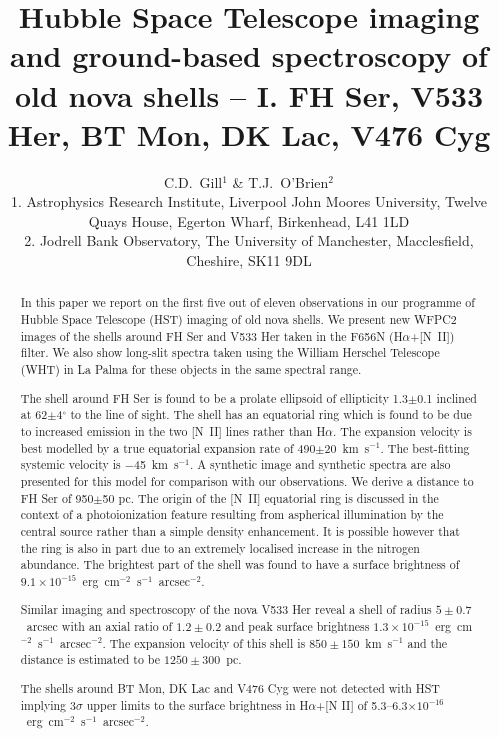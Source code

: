 
\title
[HST imaging and ground-based spectroscopy of nova shells -- I] 
{Hubble Space Telescope
imaging and ground-based spectroscopy of old nova shells -- I. 
FH Ser, V533 Her, BT Mon, DK Lac, V476 Cyg}
\author[C.D.\ Gill \& T.J.\ O'Brien]
{C.D.\ Gill$^1$ \& T.J.\ O'Brien$^2$ 
\\
1. Astrophysics Research Institute, Liverpool John Moores University, 
Twelve Quays House, Egerton Wharf, Birkenhead, L41 1LD\\
2. Jodrell Bank Observatory, The University of Manchester, Macclesfield, Cheshire, SK11 9DL
}
\maketitle
\begin{abstract}
In this paper we report on the first five out of eleven observations in
our programme of Hubble Space Telescope (HST) imaging of old nova shells.
We present new WFPC2 images of the shells around FH Ser and V533 Her 
taken in the F656N
(H$\alpha$+[N~II]) filter. We also show long-slit spectra taken using
the William Herschel Telescope (WHT) in La Palma for these objects in 
the same spectral range.

The shell around FH Ser is found to be a prolate ellipsoid of
ellipticity 1.3$\pm$0.1 inclined at 62$\pm$4$^\circ$ to the line of
sight.  The shell has an equatorial ring which is found to be due to
increased emission in the two [N~II] lines rather than H$\alpha$. The
expansion velocity is best modelled by a true equatorial expansion
rate of 490$\pm$20~km~s$^{-1}$. The best-fitting systemic velocity is
$-$45~km~s$^{-1}$.  A synthetic image and synthetic spectra are also
presented for this model for comparison with our observations. We
derive a distance to FH Ser of 950$\pm$50 pc. The origin of the [N~II]
equatorial ring is discussed in the context of a photoionization
feature resulting from aspherical illumination by the central source
rather than a simple density enhancement. It is possible however that
the ring is also in part due to an extremely localised increase in the
nitrogen abundance. The brightest part of the shell was found to have
a surface brightness of $9.1\times
10^{-15}$~erg~cm$^{-2}$~s$^{-1}$~arcsec$^{-2}$.


Similar imaging and spectroscopy of the nova V533 Her reveal a shell of 
radius $5\pm0.7$~arcsec with an axial ratio of $1.2\pm0.2$ and peak 
surface brightness
$1.3\times 10^{-15}$~erg~cm$^{-2}$~s$^{-1}$~arcsec$^{-2}$. The expansion
velocity of this shell is $850\pm150$~km~s$^{-1}$ and the distance is estimated
to be $1250\pm300$~pc. 

The shells around BT Mon, DK Lac and V476 Cyg 
were not detected with HST implying 3$\sigma$
upper limits to the surface brightness in H$\alpha$+[N II] of 5.3--6.3$\times 
10^{-16}$~erg~cm$^{-2}$~s$^{-1}$~arcsec$^{-2}$.


\end{abstract}

